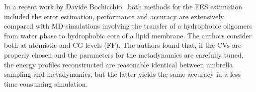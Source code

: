 In a recent work by Davide Bochicchio \etal\, \cite{metaUSComparison} both methods for the \ac{FES} estimation included the error estimation, performance and accuracy are extensively compared with \ac{MD} simulations involving the transfer of a hydrophobic oligomers from water phase to hydrophobic core of a lipid membrane. The authors consider both at atomistic and \ac{CG} levels (\martini \ac{FF}). The authors found that, if the \acp{CV} are properly chosen and the parameters for the metadynamics are carefully tuned, the energy profiles reconstructed are reasonable identical between umbrella sampling and metadynamics, but the latter yields the same accuracy in a less time consuming simulation.  







